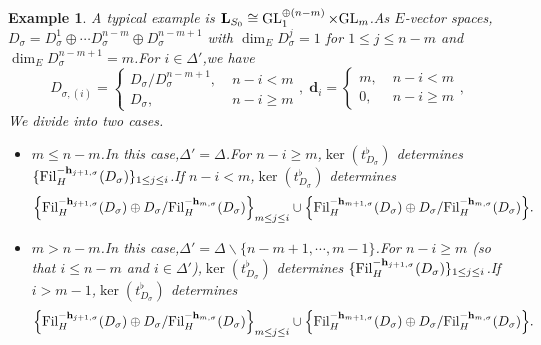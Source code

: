 \documentclass[10pt]{article}
\newtheorem{exmp}[thm]{Example}
\DeclareMathOperator{\GL}{GL}
\newcommand{\fil}{{\rm Fil}}
\newcommand{\GLN}{{\rm GL}}
\newcommand{\bL}{{\mathbf{L}}}
\newcommand{\bh}{{\mathbf{h}}}
\newcommand{\bd}{{\mathbf{d}}}
\begin{document}
\begin{exmp}
A typical example is $\bL_{S_0}\cong \GL_1^{\oplus (n-m)}\times \GLN_m$.\;As $E$-vector spaces,\;$D_{\sigma}=D_{\sigma}^1\oplus\cdots D_{\sigma}^{n-m}\oplus D_{\sigma}^{n-m+1}$ with $\dim_ED_{\sigma}^j=1$ for $1\leq j\leq n-m$ and $\dim_ED
_{\sigma}^{n-m+1}=m$.\;For $i\in \Delta'$,\;we have
\begin{equation*}
	D_{\sigma,(i)}=\left\{
	\begin{array}{ll}
		D_{\sigma}/D_{\sigma}^{n-m+1},\;&n-i<m\\
		D_{\sigma} ,\;&n-i\geq m
	\end{array}
	\right.,\;\bd_i=\left\{
	\begin{array}{ll}
		m,\;&n-i<m\\
		0,\;&n-i\geq m
	\end{array}
	\right.,\;
\end{equation*}
We divide into two cases.\;
\begin{itemize}
	\item[(1)] $m\leq n-m$.\;In this case,\;$\Delta'=\Delta$.\;For $n-i\geq m$,\;$\ker(t^{\flat}_{D_{\sigma}})$ determines $\{\fil_H^{-\bh_{j+1,\sigma}}(D_{\sigma})\}_{1\leq j\leq i}$.\;If $n-i<m$,\;$\ker(t^{\flat}_{D_{\sigma}})$ determines 
	\begin{equation*}
		\begin{aligned}
			\Big\{\fil_H^{-\bh_{j+1,\sigma}}(D_{\sigma})\oplus D_{\sigma}/\fil_H^{-\bh_{m,\sigma}}(D_{\sigma})\Big\}_{m \leq j\leq i}\cup \Big\{\fil_H^{-\bh_{m+1,\sigma}}(D_{\sigma})\oplus D_{\sigma}/\fil_H^{-\bh_{m,\sigma}}(D_{\sigma})\Big\}.
		\end{aligned}
	\end{equation*}	
	\item[(2)] $m>n-m$.\;In this case,\;$\Delta'=\Delta\backslash \{n-m+1,\cdots,m-1\}$.\;For $n-i\geq m$ (so that $i\leq n-m$ and $i\in \Delta'$),\;$\ker(t^{\flat}_{D_{\sigma}})$ determines $\{\fil_H^{-\bh_{j+1,\sigma}}(D_{\sigma})\}_{1\leq j\leq i}$.\;If $i>m-1$,\;$\ker(t^{\flat}_{D_{\sigma}})$ determines 
	\begin{equation*}
		\begin{aligned}
			\Big\{\fil_H^{-\bh_{j+1,\sigma}}(D_{\sigma})\oplus D_{\sigma}/\fil_H^{-\bh_{m,\sigma}}(D_{\sigma})\Big\}_{m \leq j\leq i}\cup \Big\{\fil_H^{-\bh_{m+1,\sigma}}(D_{\sigma})\oplus D_{\sigma}/\fil_H^{-\bh_{m,\sigma}}(D_{\sigma})\Big\}.
		\end{aligned}
	\end{equation*}	
\end{itemize}
\end{exmp}
\end{document}
